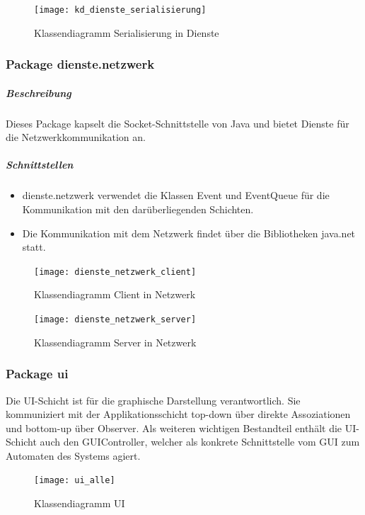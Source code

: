 \documentclass[12pt,halfparskip]{scrartcl}
\begin{document}
\begin{figure}[h]
	\centering
	\texttt{[image: kd\_dienste\_serialisierung]}
	\caption{Klassendiagramm Serialisierung in Dienste}
	\label{fig:kd_dienste_serialisierung}
\end{figure}

\clearpage
\subsubsection{Package dienste.netzwerk}
\label{ssub:package_dienste_netzwerk}
\subparagraph{Beschreibung}
Dieses Package kapselt die Socket-Schnittstelle von Java und bietet Dienste für die Netzwerkkommunikation an.

\subparagraph{Schnittstellen}
\begin{itemize}
	\item dienste.netzwerk verwendet die Klassen Event und EventQueue für die Kommunikation mit den darüberliegenden Schichten.
	\item Die Kommunikation mit dem Netzwerk findet über die Bibliotheken java.net statt.
\end{itemize}

\begin{figure}[h]
	\centering
	\texttt{[image: dienste\_netzwerk\_client]}
	\caption{Klassendiagramm Client in Netzwerk}
	\label{fig:dienste_netzwerk_client}
\end{figure}

\begin{figure}[h]
	\centering
	\texttt{[image: dienste\_netzwerk\_server]}
	\caption{Klassendiagramm Server in Netzwerk}
	\label{fig:dienste_netzwerk_server}
\end{figure}

\clearpage
\subsubsection{Package ui}
\label{ssub:package_ui}
Die UI-Schicht ist für die graphische Darstellung verantwortlich. Sie kommuniziert mit der Applikationsschicht top-down über direkte Assoziationen und bottom-up über Observer. Als weiteren wichtigen Bestandteil enthält die UI-Schicht auch den GUIController, welcher als konkrete Schnittstelle vom GUI zum Automaten des Systems agiert.

\begin{figure}[h]
	\centering
	\texttt{[image: ui\_alle]}
	\caption{Klassendiagramm UI}
	\label{fig:ui_alle}
\end{figure}
\end{document}
